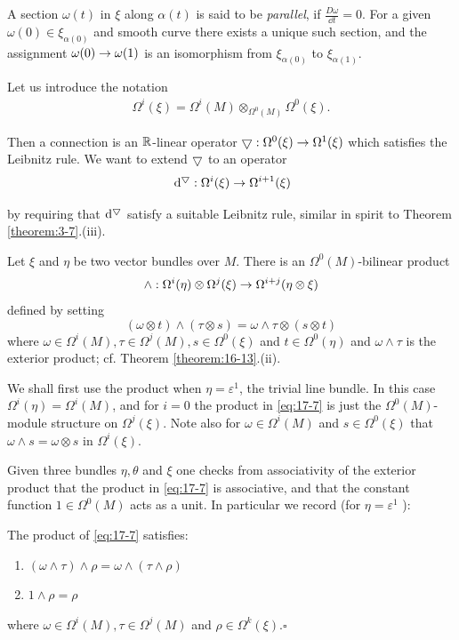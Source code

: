 A section $\omega (t)$ in $\xi$ along $\alpha (t)$ is said to be \textit{parallel}, if $\frac{D\omega }{\dd t} = 0$. 
For a given $\omega ( 0)  \in  {\xi }_{\alpha ( 0) }$ and smooth curve there exists a unique such section, 
and the assignment $\omega ( 0)  \rightarrow  \omega ( 1)$ is an isomorphism from ${\xi }_{\alpha ( 0) }$ to ${\xi }_{\alpha ( 1) }$.

Let us introduce the notation
\begin{align}\label{eq:17-6}
  \Omega^{i}(\xi)  = \Omega^{i}(M) \otimes_{\Omega^0(M) }\Omega^0(\xi).
\end{align}

Then a connection is an ${\mathbb{R}}$-linear operator $\bigtriangledown :\Omega^0(\xi)  \rightarrow  \Omega^1(\xi)$ which satisfies 
the Leibnitz rule. We want to extend $\bigtriangledown$ to an operator
\[
  \dd^\btd:\Omega^{i}(\xi)  \ra  \Omega^{i + 1}(\xi)
\]

by requiring that $\dd^\btd$ satisfy a suitable Leibnitz rule, similar in spirit to Theorem \ref{theorem:3-7}.(iii).

Let $\xi$ and $\eta$ be two vector bundles over $M$. There is an $\Omega^0(M)$-bilinear product
\begin{align}\label{eq:17-7}
  \land:\Omega^{i}( \eta )  \otimes  \Omega^{j}(\xi)  \rightarrow  \Omega^{i + j}( {\eta  \otimes  \xi })
\end{align}
defined by setting
\[
  ( {\omega  \otimes  t})  \land  ( {\tau  \otimes  s})  
  = \omega  \land  \tau  \otimes  ( {s \otimes  t})
\]
where $\omega  \in  \Omega^{i}(M),\tau  \in  \Omega^{j}(M),s \in  \Omega^0(\xi)$ 
and $t \in  \Omega^0( \eta )$ and $\omega  \land  \tau$ is the exterior product; 
cf. Theorem \ref{theorem:16-13}.(ii).

We shall first use the product when $\eta  = {\varepsilon }^1$, the trivial line bundle. 
In this case $\Omega^{i}( \eta )  = \Omega^{i}(M)$, and for $i = 0$ the product in \eqref{eq:17-7} is just 
the $\Omega^0(M)$-module structure on $\Omega^{j}(\xi)$. Note also for $\omega  \in  \Omega^{i}(M)$ and $s \in  \Omega^0(\xi)$ 
that $\omega  \land  s = \omega  \otimes  s$ in $\Omega^{i}(\xi)$.

Given three bundles $\eta,\theta$ and $\xi$ one checks from associativity of the exterior product that 
the product in \eqref{eq:17-7} is associative, and that the constant function $1 \in  \Omega^0(M)$ acts 
as a unit. In particular we record (for $\eta  = {\varepsilon }^1$ ):

\begin{lemma}\label{lemma:17-5}
  The product of \eqref{eq:17-7} satisfies:
  \begin{enumerate} 
    \item $( {\omega  \land  \tau })  \land  \rho  = \omega  \land  ( {\tau  \land  \rho })$
    \item $1 \land  \rho  = \rho$ 
  \end{enumerate}
  where $\omega  \in  \Omega^{i}(M),\tau  \in  \Omega^{j}(M)$ and $\rho  \in  \Omega^{k}(\xi)$.\hfill$\square$
\end{lemma}

